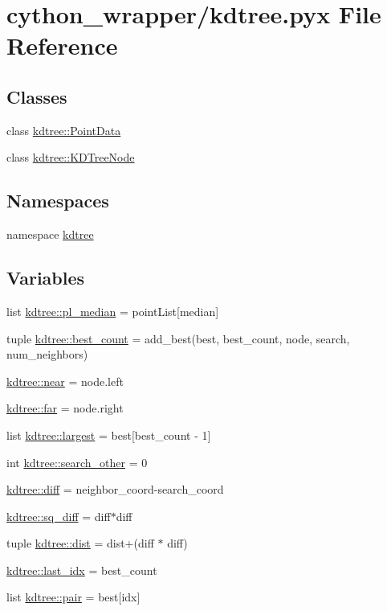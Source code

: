 \hypertarget{cython__wrapper_2kdtree_8pyx}{
\section{cython\_\-wrapper/kdtree.pyx File Reference}
\label{cython__wrapper_2kdtree_8pyx}
}
\subsection*{Classes}
\begin{DoxyCompactItemize}
\item 
class \hyperlink{classkdtree_1_1PointData}{kdtree::PointData}
\item 
class \hyperlink{classkdtree_1_1KDTreeNode}{kdtree::KDTreeNode}
\end{DoxyCompactItemize}
\subsection*{Namespaces}
\begin{DoxyCompactItemize}
\item 
namespace \hyperlink{namespacekdtree}{kdtree}
\end{DoxyCompactItemize}
\subsection*{Variables}
\begin{DoxyCompactItemize}
\item 
list \hyperlink{namespacekdtree_a68dd1b5c2ca51036f48cfb773ef665ac}{kdtree::pl\_\-median} = pointList\mbox{[}median\mbox{]}
\item 
tuple \hyperlink{namespacekdtree_a5254def45bf553b4ed113993acde66ec}{kdtree::best\_\-count} = add\_\-best(best, best\_\-count, node, search, num\_\-neighbors)
\item 
\hyperlink{namespacekdtree_a0ba21301aea56f1c2ef165f16bcc6af6}{kdtree::near} = node.left
\item 
\hyperlink{namespacekdtree_a1098829259a7546f7778cfe19c86e50c}{kdtree::far} = node.right
\item 
list \hyperlink{namespacekdtree_a8ae4f604fa3b331f0e1857ef7988dbed}{kdtree::largest} = best\mbox{[}best\_\-count -\/ 1\mbox{]}
\item 
int \hyperlink{namespacekdtree_a697ad02b362c4958d0497573757a329a}{kdtree::search\_\-other} = 0
\item 
\hyperlink{namespacekdtree_acdecd5b85843a2d9caa9703f3d246c5a}{kdtree::diff} = neighbor\_\-coord-\/search\_\-coord
\item 
\hyperlink{namespacekdtree_aa6b03574baf9af70ad70c383f1276f53}{kdtree::sq\_\-diff} = diff$\ast$diff
\item 
tuple \hyperlink{namespacekdtree_ab18cecee0f3d4292dc06665f88c9dcd1}{kdtree::dist} = dist+(diff $\ast$ diff)
\item 
\hyperlink{namespacekdtree_a0e2b4f0710247ad4a1bc44217b669f98}{kdtree::last\_\-idx} = best\_\-count
\item 
list \hyperlink{namespacekdtree_a2c9210668756589c874996518e7c43dc}{kdtree::pair} = best\mbox{[}idx\mbox{]}
\end{DoxyCompactItemize}
